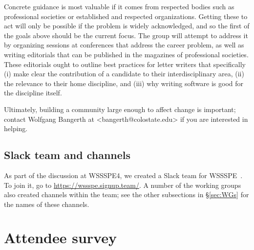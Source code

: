 \documentclass[11pt, oneside]{amsart}
\newcommand{\note}[1]{ {\textcolor{blueish}    { ***Note:      #1 }}}
\begin{document}
Concrete guidance is most valuable if it
comes from respected bodies such as professional societies or
established and respected organizations. Getting these to act
will only be possible if the problem is widely acknowledged, and so
the first of the goals above should be the current focus.
%
The group will attempt to address it by organizing sessions at conferences
that address the career problem, as well as writing editorials that
can be published in the magazines of professional societies. These
editorials ought to outline best practices for letter writers that
specifically (i) make clear the contribution of a candidate to their
interdisciplinary area, (ii) the relevance to their home discipline, and
(iii) why writing software is good for the discipline itself.

Ultimately, building a community large enough
to affect change is important; contact Wolfgang Bangerth at
<bangerth@colostate.edu> if you are interested in helping.



\subsection{Slack team and channels}\label{sec:slack}


As part of the discussion at WSSSPE4, we created a Slack team for WSSSPE~\cite{WSSSPESlack}.  To join it, go to \url{https://wssspe.signup.team/}.  A number of the working groups also created channels within the team; see the other subsections in \S\ref{sec:WGs} for the names of these channels.


\section{Attendee survey \label{sec:survey}}

\end{document}
